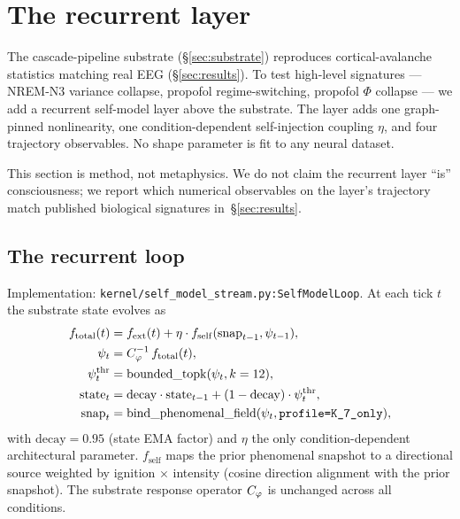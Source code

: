 \section{The recurrent layer}\label{sec:chain}

The cascade-pipeline substrate (\S\ref{sec:substrate}) reproduces
cortical-avalanche statistics matching real EEG (\S\ref{sec:results}).
To test high-level signatures — NREM-N3 variance collapse, propofol
regime-switching, propofol $\Phi$ collapse — we add a recurrent
self-model layer above the substrate. The layer adds one
graph-pinned nonlinearity, one condition-dependent self-injection
coupling $\eta$, and four trajectory observables. No shape parameter
is fit to any neural dataset.

This section is method, not metaphysics. We do not claim the
recurrent layer ``is'' consciousness; we report which numerical
observables on the layer's trajectory match published biological
signatures in~\S\ref{sec:results}.

\subsection{The recurrent loop}

Implementation: \texttt{kernel/self\_model\_stream.py:SelfModelLoop}.
At each tick $t$ the substrate state evolves as
\begin{align}
f_{\mathrm{total}}(t) &= f_{\mathrm{ext}}(t) + \eta\cdot f_{\mathrm{self}}(\mathrm{snap}_{t-1}, \psi_{t-1}), \\
\psi_{t} &= C_{\varphi}^{-1}\, f_{\mathrm{total}}(t), \\
\psi^{\mathrm{thr}}_{t} &= \mathrm{bounded\_topk}(\psi_{t}, k=12), \\
\mathrm{state}_{t} &= \mathrm{decay}\cdot\mathrm{state}_{t-1} + (1-\mathrm{decay})\cdot \psi^{\mathrm{thr}}_{t}, \\
\mathrm{snap}_{t} &= \mathrm{bind\_phenomenal\_field}(\psi_{t}, \texttt{profile=K\_7\_only}),
\end{align}
with $\mathrm{decay}=0.95$ (state EMA factor) and $\eta$ the only
condition-dependent architectural parameter. $f_{\mathrm{self}}$ maps
the prior phenomenal snapshot to a directional source weighted by
ignition $\times$ intensity (cosine direction alignment with the
prior snapshot). The substrate response operator $C_{\varphi}$ is unchanged
across all conditions.

